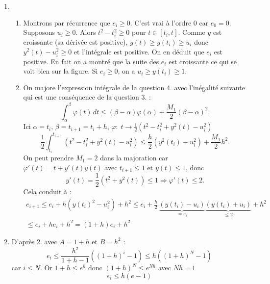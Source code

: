 \begin{enumerate}
\item \begin{enumerate}
 \item Montrons par récurrence que $e_i\geq 0$. C'est vrai à l'ordre $0$ car $e_0=0$. Supposons $u_i \geq 0$. Alors $t^2-t_i^2\geq 0$ pour $t\in[t_i,t]$. Comme $y$ est croissante (sa dérivée est positive), $y(t)\geq y(t_i)\geq u_i$ donc $y^2(t)-u_i^2\geq0$ et l'intégrale est positive. On en déduit que $e_i$ est positive. En fait on a montré que la suite des $e_i$ est croissante ce qui se voit bien sur la figure.\newline
Si $e_i\geq 0$, on a $u_i\geq y(t_i)\geq 1$.
\item On majore l'expression intégrale de la question 4. avec l'inégalité suivante qui est une conséquence de la question 3. :
\[
 \int_{\alpha}^{\beta}\varphi(t)\,dt \leq (\beta - \alpha)\varphi(\alpha) + \frac{M_1}{2}(\beta - \alpha)^2.
\]
Ici $\alpha = t_i$, $\beta = t_{i+1} = t_i + h$, $\varphi: \; t\rightarrow \frac{1}{2}\left( t^2 -t_i^2 +y^2(t)-u_i^2\right)$
\[
 \frac{1}{2}\int_{t_i}^{t_{i+1}}\left( t^2 -t_i^2 +y^2(t)-u_i^2\right)
 \leq \frac{h}{2}(y^2(t_i) - u_i^2) + \frac{M_1}{2} h^2.
\]
On peut prendre $M_1=2$ dans la majoration car $\varphi'(t) =  t +y'(t)y(t)$ avec $t_{i+1}\leq1$ et $y(t)\leq 1$, donc
\begin{displaymath}
 y'(t)=\frac{1}{2}\left( t^2+y^2(t)\right)\leq 1 \Rightarrow \varphi'(t) \leq 2.
\end{displaymath}
Cela conduit à :
\begin{multline*}
 e_{i+1}
\leq e_i + h(y(t_i)^2-u_i^2) +h^2 
\leq e_i + 
  \frac{h}{2}\,\underset{=e_i}{\underbrace{(y(t_i)-u_i)}}
    \underset{\leq 2}{\underbrace{(y(t_i)+u_i)}} +h^2
\\
 \leq e_i + he_i+h^2= (1+h)e_i + h^2
\end{multline*}
\end{enumerate}
\item D'après 2. avec $A=1+h$ et $B=h^2$ :
\begin{displaymath}
 e_i\leq\frac{h^2}{1+h-1}\left( (1+h)^i-1\right)\leq h \left( (1+h)^N-1\right)
\end{displaymath}
car $i\leq N$. Or $1+h\leq e^h$ donc $(1+h)^N\leq e^{Nh}$ avec $Nh=1$
\begin{displaymath}
 e_i\leq h(e-1)
\end{displaymath}
\end{enumerate}
